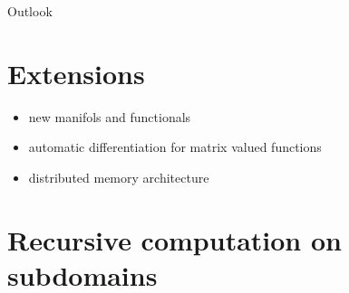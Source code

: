 \begin{chapter}{Outlook}
\label{ch:outlook}

\section{Extensions} %
\label{sec:Extensions}
\begin{itemize}
	\item new manifols and functionals
	\item automatic differentiation for matrix valued functions
	\item distributed memory architecture
\end{itemize}


\section{Recursive computation on subdomains} %
\label{sec:Recursive computation on subdomains}


\end{chapter}
